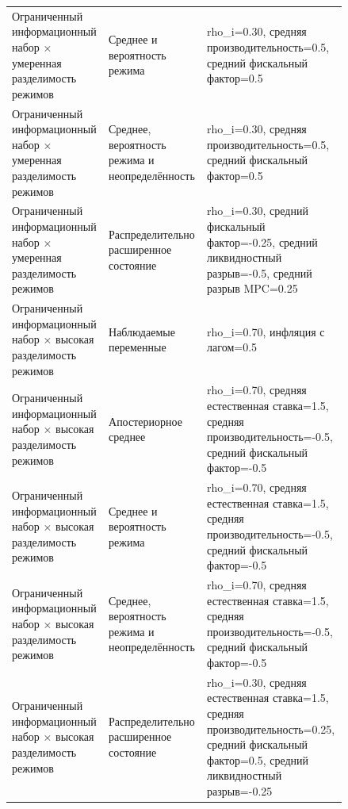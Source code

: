 \begin{tabular}{p{0.24\linewidth}p{0.22\linewidth}p{0.38\linewidth}}
Ограниченный информационный набор × умеренная разделимость режимов & Среднее и вероятность режима & rho\_i=0.30, средняя производительность=0.5, средний фискальный фактор=0.5 \\
Ограниченный информационный набор × умеренная разделимость режимов & Среднее, вероятность режима и неопределённость & rho\_i=0.30, средняя производительность=0.5, средний фискальный фактор=0.5 \\
Ограниченный информационный набор × умеренная разделимость режимов & Распределительно расширенное состояние & rho\_i=0.30, средний фискальный фактор=-0.25, средний ликвидностный разрыв=-0.5, средний разрыв MPC=0.25 \\
Ограниченный информационный набор × высокая разделимость режимов & Наблюдаемые переменные & rho\_i=0.70, инфляция с лагом=0.5 \\
Ограниченный информационный набор × высокая разделимость режимов & Апостериорное среднее & rho\_i=0.70, средняя естественная ставка=1.5, средняя производительность=-0.5, средний фискальный фактор=-0.5 \\
Ограниченный информационный набор × высокая разделимость режимов & Среднее и вероятность режима & rho\_i=0.70, средняя естественная ставка=1.5, средняя производительность=-0.5, средний фискальный фактор=-0.5 \\
Ограниченный информационный набор × высокая разделимость режимов & Среднее, вероятность режима и неопределённость & rho\_i=0.70, средняя естественная ставка=1.5, средняя производительность=-0.5, средний фискальный фактор=-0.5 \\
Ограниченный информационный набор × высокая разделимость режимов & Распределительно расширенное состояние & rho\_i=0.30, средняя естественная ставка=1.5, средняя производительность=0.25, средний фискальный фактор=0.5, средний ликвидностный разрыв=-0.25 \\
\bottomrule
\end{tabular}